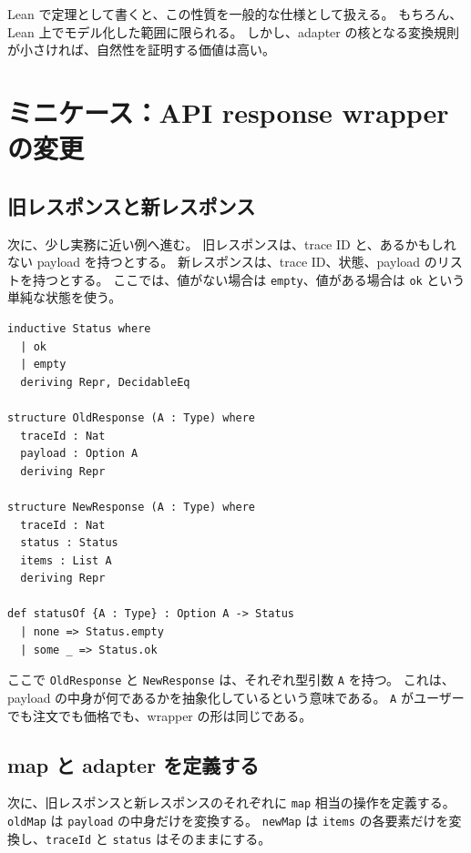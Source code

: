 Lean で定理として書くと、この性質を一般的な仕様として扱える。
もちろん、Lean 上でモデル化した範囲に限られる。
しかし、adapter の核となる変換規則が小さければ、自然性を証明する価値は高い。

\section{ミニケース：API response wrapper の変更}

\subsection{旧レスポンスと新レスポンス}

次に、少し実務に近い例へ進む。
旧レスポンスは、trace ID と、あるかもしれない payload を持つとする。
新レスポンスは、trace ID、状態、payload のリストを持つとする。
ここでは、値がない場合は \texttt{empty}、値がある場合は \texttt{ok} という単純な状態を使う。


\begin{listing}[htbp]
\begin{verbatim}
inductive Status where
  | ok
  | empty
  deriving Repr, DecidableEq

structure OldResponse (A : Type) where
  traceId : Nat
  payload : Option A
  deriving Repr

structure NewResponse (A : Type) where
  traceId : Nat
  status : Status
  items : List A
  deriving Repr

def statusOf {A : Type} : Option A -> Status
  | none => Status.empty
  | some _ => Status.ok
\end{verbatim}
\caption{旧レスポンスと新レスポンスの最小モデル}
\label{lst:ch09_api_model}
\end{listing}

ここで \texttt{OldResponse} と \texttt{NewResponse} は、それぞれ型引数 \texttt{A} を持つ。
これは、payload の中身が何であるかを抽象化しているという意味である。
\texttt{A} がユーザーでも注文でも価格でも、wrapper の形は同じである。

\subsection{map と adapter を定義する}

次に、旧レスポンスと新レスポンスのそれぞれに \texttt{map} 相当の操作を定義する。
\texttt{oldMap} は \texttt{payload} の中身だけを変換する。
\texttt{newMap} は \texttt{items} の各要素だけを変換し、\texttt{traceId} と \texttt{status} はそのままにする。

